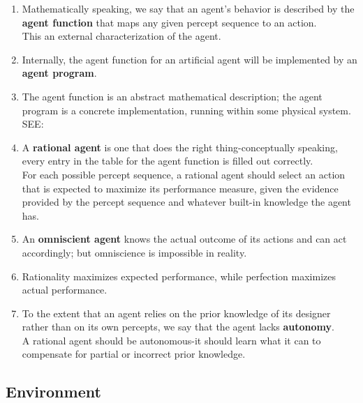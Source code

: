 \begin{enumerate}
    \item Mathematically speaking, we say that an agent’s behavior is described by the \textbf{agent function} that maps any given percept sequence to an action.\\
    This an external characterization of the agent.

    \item Internally, the agent function for an artificial agent will be implemented by an \textbf{agent program}.

    \item[] The agent function is an abstract mathematical description; the agent program is a concrete implementation, running within some physical system.\\
    SEE: 

    \item A \textbf{rational agent} is one that does the right thing-conceptually speaking, every entry in the table for the agent function is filled out correctly. \\
    For each possible percept sequence, a rational agent should select an action that is expected to maximize its performance measure, given the evidence provided by the percept sequence and whatever built-in knowledge the agent has.

    \item An \textbf{omniscient agent} knows the actual outcome of its actions and can act accordingly; but omniscience is impossible in reality. 

    \item Rationality maximizes expected performance, while perfection maximizes actual performance.

    \item To the extent that an agent relies on the prior knowledge of its designer rather than on its own percepts, we say that the agent lacks \textbf{autonomy}.\\
    A rational agent should be autonomous-it should learn what it can to compensate for partial or incorrect prior knowledge. 
\end{enumerate}


\subsection{Environment}

